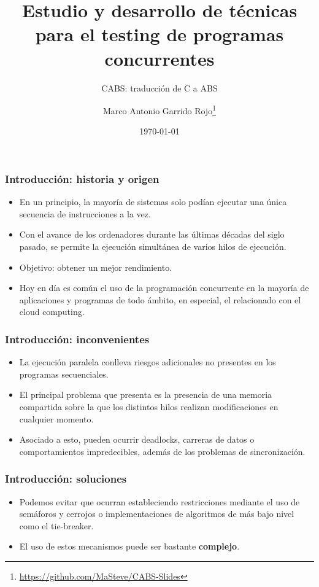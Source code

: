 \documentclass[spanish, a4paper, 12pt, final, slideColor, nototal, colorBG, pdf, noaccumulate, darkblue] {beamer}
\title{Estudio y desarrollo de técnicas para el testing de programas concurrentes}
\subtitle{CABS: traducción de C a ABS}
\author{Marco Antonio Garrido Rojo\thanks{\url{https://github.com/MaSteve/CABS-Slides}}}
\date{\today}
\begin{document}
\maketitle
\begin{frame}
  \frametitle{Introducción: historia y origen}
  \begin{itemize}
  \item En un principio, la mayoría de sistemas solo podían ejecutar una única secuencia de instrucciones a la vez.
  \item Con el avance de los ordenadores durante las últimas décadas del siglo pasado, se permite la ejecución simultánea de varios hilos de ejecución.
  \item Objetivo: obtener un mejor rendimiento.
  \item Hoy en día es común el uso de la programación concurrente en la mayoría de aplicaciones y programas de todo ámbito, en especial, el relacionado con el cloud computing.
  \end{itemize}
\end{frame}

\begin{frame}
  \frametitle{Introducción: inconvenientes}
  \begin{itemize}
  \item La ejecución paralela conlleva riesgos adicionales no presentes en los programas secuenciales.
  \item El principal problema que presenta es la presencia de una memoria compartida sobre la que los distintos hilos realizan modificaciones en cualquier momento.
  \item Asociado a esto, pueden ocurrir deadlocks, carreras de datos o comportamientos impredecibles, además de los problemas de sincronización.
  \end{itemize}
\end{frame}

\begin{frame}
  \frametitle{Introducción: soluciones}
  \begin{itemize}
  \item Podemos evitar que ocurran estableciendo restricciones mediante el uso de semáforos y cerrojos o implementaciones de algoritmos de más bajo nivel como el tie-breaker.
  \item El uso de estos mecanismos puede ser bastante \textbf{complejo}.
  \end{itemize}
\end{frame}
\end{document}
